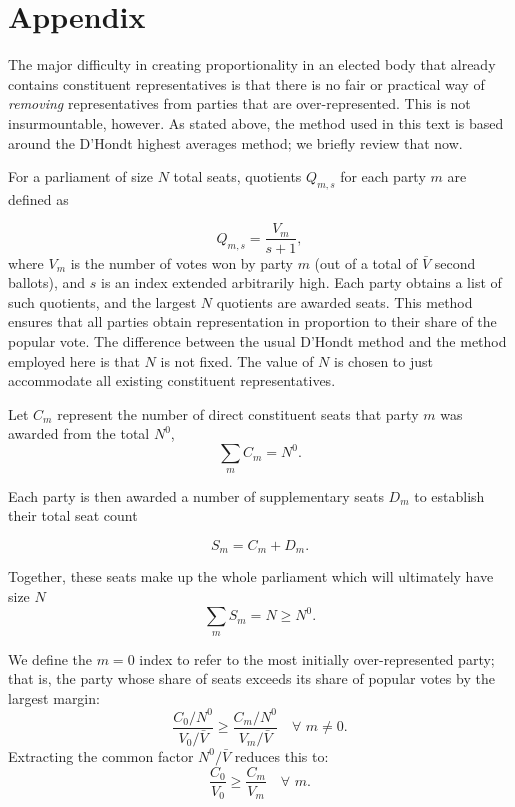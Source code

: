 \documentclass[DIV=calc, paper=a4, fontsize=11pt, twocolumn]{scrartcl}	 %
\begin{document}
\clearpage
\section{Appendix}

The major difficulty in creating proportionality in an elected body that already contains constituent representatives is that there is no fair or practical way of \emph{removing} representatives from parties that are over-represented. 
This is not insurmountable, however. As stated above, the method used in this text is based around the D'Hondt highest averages method; we briefly review that now. 

For a parliament of size $N$ total seats, quotients $Q_{m,s}$ for each party $m$ are defined as 

\begin{equation}
\label{eq:Dhondt}
Q_{m,s} = \frac{V_m}{s +1},
\end{equation}
where $V_m$ is the number of votes won by party $m$  (out of a total of $\bar{V}$ second ballots), and $s$ is an index extended arbitrarily high. 
Each party obtains a list of such quotients, and the largest $N$ quotients are awarded seats. This method ensures that all parties obtain representation in proportion to their share of the popular vote. 
The difference between the usual D'Hondt method and the method employed here is that $N$ is not fixed. The value of $N$ is chosen to just accommodate all existing constituent representatives.

Let $C_m$ represent the number of direct constituent seats that party $m$ was awarded from the total $N^0$,
\begin{equation}
\label{eq:sum_Cm}
\sum_m C_m = N^0.
\end{equation}

Each party is then awarded a number of supplementary seats $D_m$ to establish their total seat count 

\begin{equation}
\label{eq:seat_total}
S_m=C_m+D_m.
\end{equation}

Together, these seats make up the whole parliament which will ultimately have size $N$
\begin{equation}
\label{eq:sum_Sm}
\sum_m S_m = N \ge N^0.
\end{equation}


We define the $m=0$ index to refer to the most initially over-represented party; that is, the party whose share of seats exceeds its share of popular votes by the largest margin:
\begin{equation}
\frac{C_0/N^0}{V_0/\bar{V}} \ge \frac{C_m/N^0}{V_m/\bar{V}} \,\, \,\,\,\, \forall \,\, m \neq 0.
\end{equation}
Extracting the common factor $N^0/\bar{V}$ reduces this to:
\begin{equation}
\label{eq:most_overrep}
\frac{C_0}{V_0} \ge \frac{C_m}{V_m} \,\, \,\,\,\, \forall \,\, m.
\end{equation}
\end{document}
